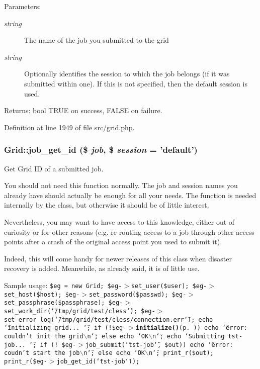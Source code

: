 \begin{Desc}
\item[Parameters:]
\begin{description}
\item[{\em string}]The name of the job you submitted to the grid \item[{\em string}]Optionally identifies the session to which the job belongs (if it was submitted within one). If this is not specified, then the default session is used. \end{description}
\end{Desc}
\begin{Desc}
\item[Returns:]bool TRUE on success, FALSE on failure. \end{Desc}


Definition at line 1949 of file src/grid.php.
\subsubsection{\setlength{\rightskip}{0pt plus 5cm}Grid::job\_\-get\_\-id (\$ {\em job}, \$ {\em session} = 'default')}\label{classGrid_a48}


Get Grid ID of a submitted job. 

You should not need this function normally. The job and session names you already have should actually be enough for all your needs. The function is needed internally by the class, but otherwise it should be of little interest.

Nevertheless, you may want to have access to this knowledge, either out of curiosity or for other reasons (e.g. re-routing access to a job through other access points after a crash of the original access point you used to submit it).

Indeed, this will come handy for newer releases of this class when disaster recovery is added. Meanwhile, as already said, it is of little use.

Sample usage: {\tt  \$eg = new Grid; \$eg-$>$set\_\-user(\$user); \$eg-$>$set\_\-host(\$host); \$eg-$>$set\_\-password(\$passwd); \$eg-$>$set\_\-passphrase(\$passphrase); \$eg-$>$set\_\-work\_\-dir(\char`\"{}/tmp/grid/test/cless\char`\"{}); \$eg-$>$set\_\-error\_\-log(\char`\"{}/tmp/grid/test/cless/connection.err\char`\"{}); echo \char`\"{}initializing grid... \char`\"{}; if (!\$eg-$>${\bf initialize()}{\rm (p.\,\pageref{classGrid_a11})}) echo \char`\"{}error: couldn't init the grid$\backslash$n\char`\"{}; else echo \char`\"{}OK$\backslash$n\char`\"{}; echo \char`\"{}Submitting tst-job... \char`\"{}; if (! \$eg-$>$job\_\-submit(\char`\"{}tst-job\char`\"{}, \$out)) echo \char`\"{}error: coudn't start the job$\backslash$n\char`\"{}; else echo \char`\"{}OK$\backslash$n\char`\"{}; print\_\-r(\$out); print\_\-r(\$eg-$>$job\_\-get\_\-id(\char`\"{}tst-job\char`\"{})); }

